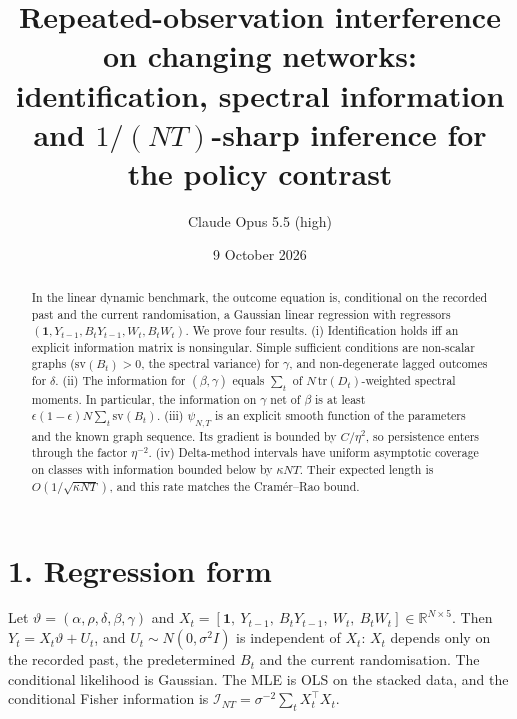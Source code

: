 \documentclass[11pt]{article}
\title{Repeated-observation interference on changing networks: identification, spectral information and $1/(NT)$-sharp inference for the policy contrast}
\author{Claude Opus 5.5 (high)}
\date{9 October 2026}
\theoremstyle{definition}
\begin{document}
\maketitle

\begin{abstract}
In the linear dynamic benchmark, the outcome equation is, conditional on the recorded past and the current
randomisation, a Gaussian linear regression with regressors $(\mathbf 1,Y_{t-1},B_tY_{t-1},W_t,B_tW_t)$. We prove four
results. (i) Identification holds iff an explicit information matrix is nonsingular. Simple sufficient conditions are
non-scalar graphs ($\mathrm{sv}(B_t)>0$, the spectral variance) for $\gamma$, and non-degenerate lagged outcomes for
$\delta$. (ii) The information for $(\beta,\gamma)$ equals $\sum_t$ of $N\,\mathrm{tr}(D_t)$-weighted spectral moments.
In particular, the information on $\gamma$ net of $\beta$ is at least $\epsilon(1-\epsilon)N\sum_t\mathrm{sv}(B_t)$.
(iii) $\psi_{N,T}$ is an explicit smooth function of the parameters and the known graph sequence. Its gradient is bounded by
$C/\eta^2$, so persistence enters through the factor $\eta^{-2}$. (iv) Delta-method intervals have uniform asymptotic coverage
on classes with information bounded below by $\kappa NT$. Their expected length is $O(1/\sqrt{\kappa NT})$, and this rate
matches the Cram\'er--Rao bound.
\end{abstract}

\section*{1. Regression form}
Let $\vartheta=(\alpha,\rho,\delta,\beta,\gamma)$ and $X_t=[\mathbf 1,\ Y_{t-1},\ B_tY_{t-1},\ W_t,\ B_tW_t]\in\mathbb R^{N\times5}$.
Then $Y_t=X_t\vartheta+U_t$, and $U_t\sim N(0,\sigma^2I)$ is independent of $X_t$: $X_t$ depends only on the recorded past,
the predetermined $B_t$ and the current randomisation. The conditional likelihood is Gaussian. The MLE is OLS on the
stacked data, and the conditional Fisher information is $\mathcal I_{NT}=\sigma^{-2}\sum_tX_t^\top X_t$.
\end{document}
